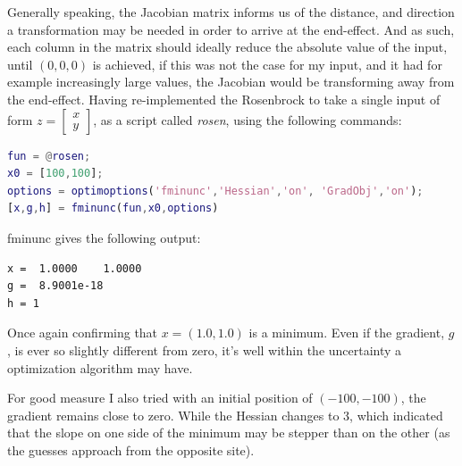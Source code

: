 \documentclass[11pt]{article} %
\begin{document}
Generally speaking, the Jacobian matrix informs us of the distance, and direction a transformation may be needed in order to arrive at the end-effect. And as such, each column in the matrix should ideally reduce the absolute value of the input, until $(0,0,0)$ is achieved, if this was not the case for my input, and it had for example increasingly large values, the Jacobian would be transforming away from the end-effect.
\newpage
Having re-implemented the Rosenbrock to take a single input of form $z=\begin{bmatrix}x\\y\end{bmatrix}$, as a script called \textit{rosen}, using the following commands:
\begin{lstlisting}[language=matlab]
fun = @rosen;
x0 = [100,100];
options = optimoptions('fminunc','Hessian','on', 'GradObj','on');
[x,g,h] = fminunc(fun,x0,options)
\end{lstlisting}
fminunc gives the following output:
\begin{lstlisting}
x =  1.0000    1.0000
g =  8.9001e-18
h = 1
\end{lstlisting}
Once again confirming that $x=(1.0,1.0)$ is a minimum. Even if the gradient, $g$, is ever so slightly different from zero, it's well within the uncertainty a optimization algorithm may have.

For good measure I also tried with an initial position of $(-100, -100)$, the gradient remains close to zero. While the Hessian changes to 3, which indicated that the slope on one side of the minimum may be stepper than on the other (as the guesses approach from the opposite site).
\end{document}
